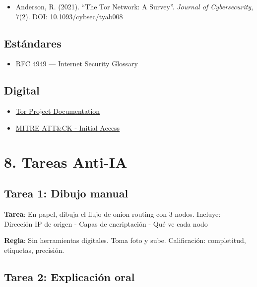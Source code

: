 \documentclass[
  letterpaper,
]{report}
\providecommand{\tightlist}{%
  \setlength{\itemsep}{0pt}\setlength{\parskip}{0pt}}
\begin{document}
\begin{itemize}
\tightlist
\item
  Anderson, R. (2021). ``The Tor Network: A Survey''. \emph{Journal of
  Cybersecurity}, 7(2). DOI: 10.1093/cybsec/tyab008
\end{itemize}

\subsection{Estándares}\label{estuxe1ndares}

\begin{itemize}
\tightlist
\item
  RFC 4949 --- Internet Security Glossary
\end{itemize}

\subsection{Digital}\label{digital}

\begin{itemize}
\tightlist
\item
  \href{https://tb-manual.torproject.org/}{Tor Project Documentation}
\item
  \href{https://attack.mitre.org/tactics/TA0001/}{MITRE ATT\&CK -
  Initial Access}
\end{itemize}

\section{8. Tareas Anti-IA}\label{tareas-anti-ia}

\subsection{Tarea 1: Dibujo manual}\label{tarea-1-dibujo-manual}

\textbf{Tarea}: En papel, dibuja el flujo de onion routing con 3 nodos.
Incluye: - Dirección IP de origen - Capas de encriptación - Qué ve cada
nodo

\textbf{Regla}: Sin herramientas digitales. Toma foto y sube.
Calificación: completitud, etiquetas, precisión.

\subsection{Tarea 2: Explicación
oral}\label{tarea-2-explicaciuxf3n-oral}
\end{document}
